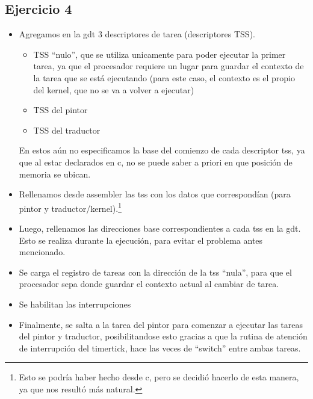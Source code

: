 \subsection{Ejercicio 4}
\begin{itemize}
 \item Agregamos en la gdt 3 descriptores de tarea (descriptores TSS).
	\begin{itemize}
 		\item TSS ``nulo'', que se utiliza unicamente para poder ejecutar la primer tarea, ya que el procesador requiere un lugar para guardar el contexto de la tarea que se est\'a ejecutando (para este caso, el contexto es el propio del kernel, que no se va a volver a ejecutar)
		\item TSS del pintor
		\item TSS del traductor
	\end{itemize}
	En estos a\'un no especificamos la base del comienzo de cada descriptor tss, ya que al estar declarados en c, no se puede saber a priori en que posici\'on de memoria se ubican.

 \item Rellenamos desde assembler las tss con los datos que correspond\'ian (para pintor y traductor/kernel).\footnote{Esto se podr\'ia haber hecho desde c, pero se decidi\'o hacerlo de esta manera, ya que nos result\'o m\'as natural.}
 \item Luego, rellenamos las direcciones base correspondientes a cada tss en la gdt. Esto se realiza durante la ejecuci\'on, para evitar el problema antes mencionado.
 \item Se carga el registro de tareas con la direcci\'on de la tss ``nula'', para que el procesador sepa donde guardar el contexto actual al cambiar de tarea.
 \item Se habilitan las interrupciones
 \item Finalmente, se salta a la tarea del pintor para comenzar a ejecutar las tareas del pintor y traductor, posibilitandose esto gracias a que la rutina de atenci\'on de interrupci\'on del timertick, hace las veces de ``switch'' entre ambas tareas.
\end{itemize}
